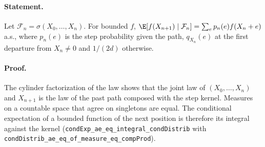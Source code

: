 \paragraph{Statement.} Let $\mathcal F_n=\sigma(X_0,\dots,X_n)$. For bounded $f$,
$\E[f(X_{n+1})\mid\mathcal F_n]=\sum_{e}p_n(e)f(X_n+e)$ a.s., where $p_n(e)$ is the step
probability given the path, $q_{X_n}(e)$ at the first departure from $X_n\neq0$ and $1/(2d)$ otherwise.
\paragraph{Proof.} The cylinder factorization of the law shows that the joint law of
$(X_0,\dots,X_n)$ and $X_{n+1}$ is the law of the past path composed with the step kernel. Measures
on a countable space that agree on singletons are equal. The conditional expectation of a bounded
function of the next position is therefore its integral against the kernel
(\texttt{condExp\_ae\_eq\_integral\_condDistrib} with
\texttt{condDistrib\_ae\_eq\_of\_measure\_eq\_compProd}).
